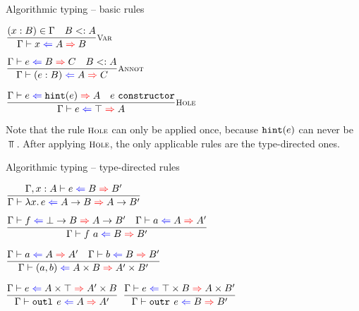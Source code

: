 \documentclass{beamer}
\begin{document}
\begin{frame}{Algorithmic typing -- basic rules}

\begin{center}
  $\infrule[Var]{\sidecond{(x : B) \in \Gamma} \quad \sidecond{\subtyping{B}{A}}}{\hinting{x}{A}{B}}$

  \vspace{2em}

  $\infrule[Annot]{\hinting{e}{B}{C} \quad \sidecond{\subtyping{B}{A}}}{\hinting{\annot{e}{B}}{A}{C}}$

  \vspace{2em}

  $\infrule[Hole]{\hinting{e}{\hintfor{e}}{A} \quad \sidecond{e\ \texttt{constructor}}}{\hinting{e}{\Top}{A}}$
\end{center}

\vspace{2em}

Note that the rule $\textsc{\footnotesize{Hole}}$ can only be applied once, because $\texttt{hint}(e)$ can never be $\Top$. After applying $\textsc{\footnotesize{Hole}}$, the only applicable rules are the type-directed ones.

\end{frame}

\begin{frame}{Algorithmic typing -- type-directed rules}

\begin{center}
  $\infrule{\hinting[\extend{\Gamma}{x}{A}]{e}{B}{B'}}{\hinting{\fun{x}{e}}{\Fun{A}{B}}{\Fun{A}{B'}}}$

  \vspace{2em}

  $\infrule{\hinting{f}{\Fun{\Bot}{B}}{\Fun{A}{B'}} \quad \hinting{a}{A}{A'}}{\hinting{\app{f}{a}}{B}{B'}}$

  \vspace{2em}

  $\infrule{\hinting{a}{A}{A'} \quad \hinting{b}{B}{B'}}{\hinting{\pair{a}{b}}{\Prod{A}{B}}{\Prod{A'}{B'}}}$

  \vspace{2em}

  $\infrule{\hinting{e}{\Prod{A}{\Top}}{\Prod{A'}{B}}}{\hinting{\outl{e}}{A}{A'}}$ \quad
  $\infrule{\hinting{e}{\Prod{\Top}{B}}{\Prod{A}{B'}}}{\hinting{\outr{e}}{B}{B'}}$
\end{center}

\end{frame}
\end{document}
